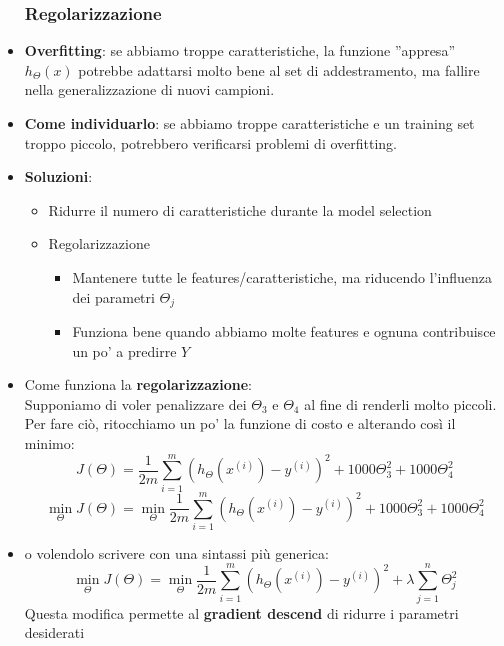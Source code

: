 \documentclass[10pt,oneside,a4paper]{article}
\begin{document}
\begin{itemize}
\subsubsection{Regolarizzazione}
\item \textbf{Overfitting}: se abbiamo troppe caratteristiche, la funzione ''appresa'' $h_{\Theta}(x)$ potrebbe adattarsi molto bene al set di addestramento, ma fallire nella generalizzazione di nuovi campioni. \\
\item \textbf{Come individuarlo}: se abbiamo troppe caratteristiche e un training set troppo piccolo, potrebbero verificarsi problemi di overfitting.
\item \textbf{Soluzioni}: 
\begin{itemize}
\item Ridurre il numero di caratteristiche durante la model selection
\item Regolarizzazione

\begin{itemize}
\item Mantenere tutte le features/caratteristiche, ma riducendo l'influenza dei parametri $\Theta_{j}$
\item Funziona bene quando abbiamo molte features e ognuna contribuisce un po' a predirre $Y$


\end{itemize}

\end{itemize}
\item Come funziona la \textbf{regolarizzazione}: \\
Supponiamo di voler penalizzare dei $\Theta_{3}$ e $\Theta_{4}$ al fine di renderli molto piccoli.\\
Per fare ciò, ritocchiamo un po' la funzione di costo e alterando così il minimo:
$$ J(\Theta)= \frac{1}{2m} \sum_{i=1}^{m}(h_{\Theta}(x^{(i)})-y^{(i)})^2+1000\Theta_{3}^{2}+1000\Theta_{4}^{2}$$
$$\min_{\Theta} J(\Theta)=\min_{\Theta} \frac{1}{2m} \sum_{i=1}^{m}(h_{\Theta}(x^{(i)})-y^{(i)})^2+1000\Theta_{3}^{2}+1000\Theta_{4}^{2}$$

\item o volendolo scrivere con una sintassi più generica:
$$\min_{\Theta} J(\Theta)=\min_{\Theta} \frac{1}{2m} \sum_{i=1}^{m}(h_{\Theta}(x^{(i)})-y^{(i)})^2+\lambda \sum_{j=1}^{n}\Theta_{j}^{2}$$
Questa modifica permette al \textbf{gradient descend} di ridurre i parametri desiderati


\end{itemize}
\end{document}
